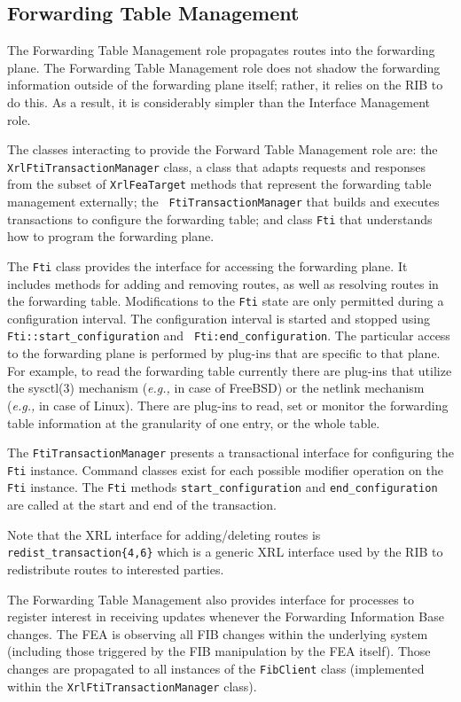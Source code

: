 \documentclass[11pt]{article}
\newcommand{\eg}{\emph{e.g.,}\xspace}
\begin{document}
\subsection{Forwarding Table Management}

The Forwarding Table Management role propagates routes into the
forwarding plane.  The Forwarding Table Management role does not
shadow the forwarding information outside of the forwarding plane
itself; rather, it relies on the RIB to do this.  As a result, it is
considerably simpler than the Interface Management role.

The classes interacting to provide the Forward Table Management role
are: the {\tt XrlFtiTransactionManager} class, a class that adapts
requests and responses from the subset of {\tt XrlFeaTarget} methods
that represent the forwarding table management externally; the {\tt
FtiTransactionManager} that builds and executes transactions to
configure the forwarding table; and class {\tt Fti} that understands
how to program the forwarding plane.

The {\tt Fti} class provides the interface for accessing the
forwarding plane.  It includes methods for adding and
removing routes, as well as resolving routes in the forwarding table.
Modifications to the {\tt Fti} state are only permitted during a
configuration interval.  The configuration interval is started and
stopped using {\tt Fti::start\_configuration} and {\tt
Fti:end\_configuration}.  The particular access to the forwarding
plane is performed by plug-ins that are specific to that
plane. For example, to read the forwarding table currently there are
plug-ins that utilize the sysctl(3) mechanism (\eg in case of FreeBSD)
or the netlink mechanism (\eg in case of Linux). There are
plug-ins to read, set or monitor the forwarding table information
at the granularity of one entry, or the whole table.

The {\tt FtiTransactionManager} presents a transactional interface for
configuring the {\tt Fti} instance.  Command classes exist for each
possible modifier operation on the {\tt Fti} instance.  The {\tt Fti}
methods {\tt start\_configuration} and {\tt end\_configuration} are
called at the start and end of the transaction.

Note that the XRL interface for adding/deleting routes is
{\tt redist\_transaction\{4,6\}} which is a generic XRL interface
used by the RIB to redistribute routes to interested parties.

The Forwarding Table Management also provides interface for
processes to register interest in receiving updates whenever
the Forwarding Information Base changes. The FEA is observing
all FIB changes within the underlying system (including those triggered
by the FIB manipulation by the FEA itself). Those changes are propagated
to all instances of the {\tt FibClient} class (implemented within the
{\tt XrlFtiTransactionManager} class).
\end{document}
